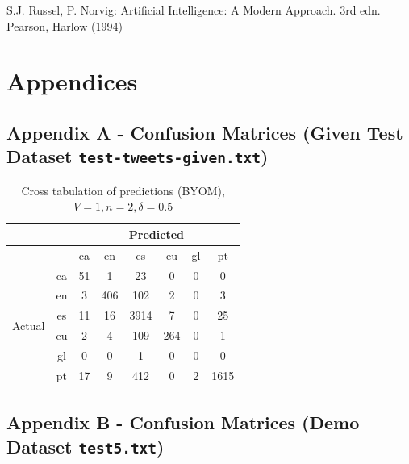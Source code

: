 \documentclass[runningheads]{llncs}
\newcommand{\code}[1]{\texttt{#1}}
\begin{document}
\begin{thebibliography}{8}
    
S.J. Russel, P. Norvig: Artificial Intelligence: A Modern Approach. 3rd edn. Pearson, Harlow (1994)

\end{thebibliography}

\section{Appendices}
\subsection{Appendix A - Confusion Matrices (Given Test Dataset \code{test-tweets-given.txt})}










\begin{table}
	\centering
	\caption{Cross tabulation of predictions (BYOM), $V=1, n=2, \delta=0.5$}
	\begin{tabular}{|c|c|c|c|c|c|c|c|} \hline
		& & \multicolumn{6}{c|}{Predicted} \\ \hline
		& &  ca &   en &    es &   eu &  gl &    pt \\ \hline
		\multirow{6}{*}{Actual} & ca   &  51 &    1 &    23 &    0 &   0 &     0 \\
		& en   &   3 &  406 &   102 &    2 &   0 &     3 \\
		& es   &  11 &   16 &  3914 &    7 &   0 &    25 \\
		& eu   &   2 &    4 &   109 &  264 &   0 &     1 \\
		& gl   &   0 &    0 &     1 &    0 &   0 &     0 \\
		& pt   &  17 &    9 &   412 &    0 &   2 &  1615 \\ \hline
	\end{tabular}
\end{table}

\newpage

\subsection{Appendix B - Confusion Matrices (Demo Dataset \code{test5.txt})}
\end{document}

